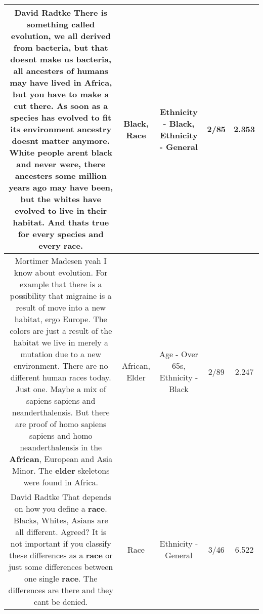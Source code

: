 \documentclass[11pt]{article}
\newlength\mylength
\begin{document}
\begin{center}
\begin{longtable}{|C{.65\mylength}|C{.30\mylength}|C{.12\mylength}|C{.12\mylength}|C{.12\mylength}|}
  \small David Radtke There is something called evolution, we all derived from bacteria, but that doesnt make us bacteria, all ancesters of humans may have lived in Africa, but you have to make a cut there. As soon as a species has evolved to fit its environment ancestry doesnt matter anymore. White people arent \textbf{black} and never were, there ancesters some million years ago may have been, but the whites have evolved to live in their habitat. And thats true for every species and every \textbf{race}.\normalsize   & Black, Race & Ethnicity - Black, Ethnicity - General & 2/85 & 2.353 \\  \hline
  \small Mortimer Madesen yeah I know about evolution. For example that there is a possibility that migraine is a result of move into a new habitat, ergo Europe. The colors are just a result of the habitat we live in merely a mutation due to a new environment. There are no different human races today. Just one. Maybe a mix of sapiens sapiens and neanderthalensis. But there are proof of homo sapiens sapiens and homo neanderthalensis in the \textbf{African}, European and Asia Minor. The \textbf{elder} skeletons were found in Africa.\normalsize   & African, Elder & Age - Over 65s, Ethnicity - Black & 2/89 & 2.247 \\  \hline
  \small David Radtke That depends on how you define a \textbf{race}. Blacks, Whites, Asians are all different. Agreed? It is not important if you classify these differences as a \textbf{race} or just some differences between one single \textbf{race}. The differences are there and they cant be denied.\normalsize   & Race & Ethnicity - General & 3/46 & 6.522 \\  \hline

\end{longtable}
\end{center}
\end{document}
